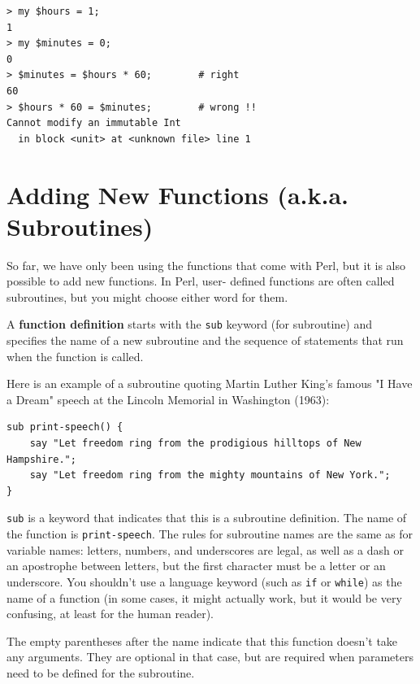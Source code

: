 \begin{verbatim}
> my $hours = 1;
1
> my $minutes = 0;
0
> $minutes = $hours * 60;        # right 
60
> $hours * 60 = $minutes;        # wrong !!
Cannot modify an immutable Int
  in block <unit> at <unknown file> line 1
\end{verbatim}
%


\section{Adding New Functions (a.k.a. Subroutines)}

So far, we have only been using the functions that come with Perl,
but it is also possible to add new functions. In Perl, user-
defined functions are often called subroutines, but you might choose 
either word for them. 

A {\bf function definition} starts with the {\tt sub} keyword (for
subroutine) and specifies the name of a new subroutine and
the sequence of statements that run when the function is called.

Here is an example of a subroutine quoting Martin Luther King's 
famous "I Have a Dream" speech at the Lincoln Memorial in 
Washington (1963):

\begin{verbatim}
sub print-speech() {
    say "Let freedom ring from the prodigious hilltops of New Hampshire.";
    say "Let freedom ring from the mighty mountains of New York.";
}
\end{verbatim}
%
{\tt sub} is a keyword that indicates that this is a subroutine
definition.  The name of the function is \verb"print-speech".  The
rules for subroutine names are the same as for variable names: letters,
numbers, and underscores are legal, as well as a dash or an 
apostrophe between letters, but the first character
must be a letter or an underscore.  You shouldn't use a 
language keyword (such as {\tt if} or {\tt while}) as 
the name of a function (in some cases, it might actually work, 
but it would be very confusing, at least for the human reader).

The empty parentheses after the name indicate that this function
doesn't take any arguments. They are optional in that case, but are 
required when parameters need to be defined for the subroutine.

